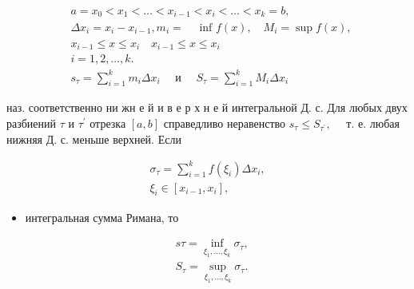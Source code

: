 \documentclass[10pt]{article}
\begin{document}
\[

\begin{aligned}

& a=x_{0}<x_{1}<\ldots<x_{i-1}<x_{i}<\ldots<x_{k}=b, \\

& \Delta x_{i}=x_{i}-x_{i-1}, m_{i}=\quad \text { inf } f(x), \quad M_{i}=\sup f(x) \text {, } \\

& x_{i-1} \leqslant x \leqslant x_{i} \quad x_{i-1} \leqslant x \leqslant x_{i} \\

& i=1,2, \ldots, k \text {. } \\

& s_{\tau}=\sum_{i=1}^{k} m_{i} \Delta x_{i} \quad \text { и } \quad S_{\tau}=\sum_{i=1}^{k} M_{i} \Delta x_{i}

\end{aligned}

\]



наз. соответственно ни жн е й и в е р х н е й интегральной Д. с. Для любых двух разбиений $\tau$ и $\tau^{\prime}$ отрезка $[a, b]$ справедливо неравенство $s_{\tau} \leqslant S_{\tau^{\prime}}, \quad$ т. е. любая нижняя Д. с. меньше верхней. Если



\[

\begin{gathered}

\sigma_{\tau}=\sum_{i=1}^{k} f\left(\xi_{i}\right) \Delta x_{i}, \\

\xi_{i} \in\left[x_{i-1}, x_{i}\right],

\end{gathered}

\]



\begin{itemize}

  \item интегральная сумма Римана, то

\end{itemize}



\[

\begin{aligned}

& s \tau=\inf _{\xi_{1}, \ldots, \xi_{k}} \sigma_{\tau}, \\

& S_{\tau}=\sup _{\xi_{1}, \ldots, \xi_{k}} \sigma_{\tau} .

\end{aligned}

\]
\end{document}
